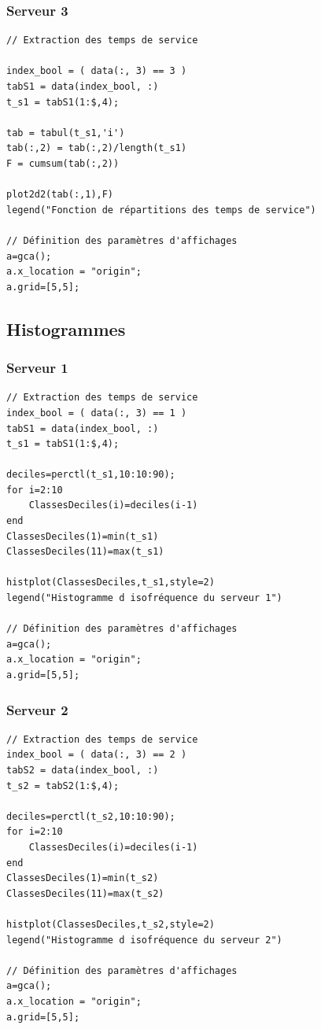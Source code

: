 \documentclass{article}
\begin{document}
\subsubsection{Serveur 3}
\begin{verbatim}
// Extraction des temps de service

index_bool = ( data(:, 3) == 3 )
tabS1 = data(index_bool, :)
t_s1 = tabS1(1:$,4);

tab = tabul(t_s1,'i')
tab(:,2) = tab(:,2)/length(t_s1)
F = cumsum(tab(:,2))

plot2d2(tab(:,1),F)
legend("Fonction de répartitions des temps de service")

// Définition des paramètres d'affichages
a=gca();
a.x_location = "origin";
a.grid=[5,5];
\end{verbatim}

\subsection{Histogrammes}

\subsubsection{Serveur 1}
\begin{verbatim}
// Extraction des temps de service
index_bool = ( data(:, 3) == 1 )
tabS1 = data(index_bool, :)
t_s1 = tabS1(1:$,4);

deciles=perctl(t_s1,10:10:90);
for i=2:10
    ClassesDeciles(i)=deciles(i-1)
end
ClassesDeciles(1)=min(t_s1)
ClassesDeciles(11)=max(t_s1)

histplot(ClassesDeciles,t_s1,style=2)
legend("Histogramme d isofréquence du serveur 1")

// Définition des paramètres d'affichages
a=gca();
a.x_location = "origin";
a.grid=[5,5];
\end{verbatim}

\subsubsection{Serveur 2}
\begin{verbatim}
// Extraction des temps de service
index_bool = ( data(:, 3) == 2 )
tabS2 = data(index_bool, :)
t_s2 = tabS2(1:$,4);

deciles=perctl(t_s2,10:10:90);
for i=2:10
    ClassesDeciles(i)=deciles(i-1)
end
ClassesDeciles(1)=min(t_s2)
ClassesDeciles(11)=max(t_s2)

histplot(ClassesDeciles,t_s2,style=2)
legend("Histogramme d isofréquence du serveur 2")

// Définition des paramètres d'affichages
a=gca();
a.x_location = "origin";
a.grid=[5,5];
\end{verbatim}
\end{document}
